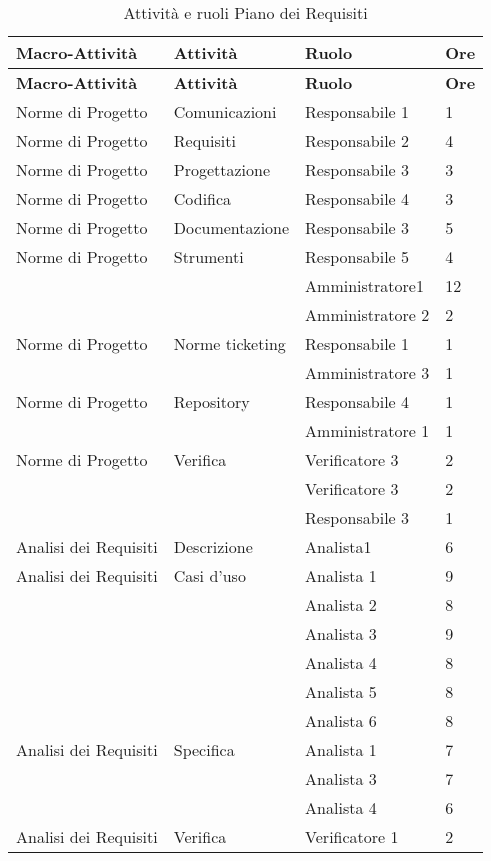 {{	\begin{longtable} [c]{| l | l | l | l |}
		\caption{Attivit\`{a} e ruoli Piano dei Requisiti \label{tab:pianorequisiti}}\\
		 \hline
		 \textbf{Macro-Attivit\`{a}} & \textbf{Attivit\`{a}} & \textbf{Ruolo} & \textbf{Ore}\\
		 \hline
		 \endfirsthead
		 \hline
		 \textbf{Macro-Attivit\`{a}} & \textbf{Attivit\`{a}} & \textbf{Ruolo} & \textbf{Ore}\\
		 \hline
		\endhead
		 \hline
		 \endfoot
		 \hline
		 \endlastfoot
		Norme di Progetto & Comunicazioni & Responsabile 1 & 1\\
		Norme di Progetto & Requisiti & Responsabile 2 & 4\\
		Norme di Progetto & Progettazione & Responsabile 3 & 3\\
		Norme di Progetto & Codifica & Responsabile 4 & 3\\
		Norme di Progetto & Documentazione & Responsabile 3 & 5\\
		Norme di Progetto & Strumenti	&	Responsabile 5	&	4\\
		&	&	Amministratore1	&	12\\
		&	&	Amministratore 2	&	2\\
		Norme di Progetto & Norme ticketing &	Responsabile 1	&	1\\
		&	&	Amministratore 3 & 1\\
		Norme di Progetto & Repository &	Responsabile 4	&	1\\
		&	&	Amministratore 1	&	1\\
		Norme di Progetto & Verifica & Verificatore 3 & 2\\
		&	&	Verificatore 3 & 2\\
		&	&	Responsabile 3 & 1\\
		Analisi dei Requisiti & Descrizione & Analista1 & 6\\
		Analisi dei Requisiti & Casi d'uso & Analista 1 & 9\\
		&	&	Analista 2 & 8\\
		&	&	Analista 3 & 9\\
		&	&	Analista 4 & 8\\
		&	&	Analista 5 & 8\\
		&	&	Analista 6 & 8\\
		Analisi dei Requisiti & Specifica & Analista 1 & 7\\
		&	&	Analista 3 & 7\\
		&	&	Analista 4 & 6\\
		Analisi dei Requisiti & Verifica & Verificatore 1 & 2\\

\end{longtable}}}
